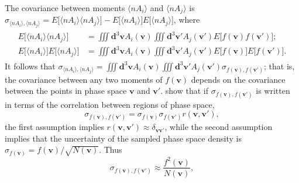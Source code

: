   The covariance between moments $\langle n A_i \rangle$ and $\langle
  n A_j \rangle$ is $\sigma_{\langle n A_i \rangle,\langle n A_j
    \rangle} = E \big [\langle n A_i \rangle\langle n A_j \rangle \big
  ] - E \big [\langle n A_i \rangle \big ] E \big [\langle n A_j
  \rangle \big ]$, where
    \begin{align}
      \begin{split}
        E \big [\langle n A_i \rangle\langle n A_j \rangle
        \big ] &= \iiint \mathbf{d}^3 \mathbf{v} A_i (\mathbf{v}) \iiint \mathbf{d}^3 \mathbf{v'} A_j (\mathbf{v'}) E \big [f(\mathbf{v}) f(\mathbf{v'}) \big ];
        \\
        E \big [\langle n A_i \rangle \big ] E \big [\langle n A_j
        \rangle \big ] &= \iiint \mathbf{d}^3 \mathbf{v} A_i (\mathbf{v}) \iiint \mathbf{d}^3 \mathbf{v'} A_j (\mathbf{v'}) E \big [f(\mathbf{v}) \big ] E \big [ f(\mathbf{v'}) \big ].
      \end{split}
    \end{align}
  It follows that $ \sigma_{\langle n A_i \rangle,\langle n A_j
    \rangle } = \iiint \mathbf{d}^3 \mathbf{v} A_i (\mathbf{v}) \iiint
  \mathbf{d}^3 \mathbf{v'} A_j (\mathbf{v'})
  \sigma_{f(\mathbf{v}),f(\mathbf{v'})}$; that is, the covariance
  between any two moments of $f(\mathbf{v})$ depends on the covariance
  between the points in phase space $\mathbf{v}$ and
  $\mathbf{v'}$. \citet{Gershman2015} show that if
  $\sigma_{f(\mathbf{v}),f(\mathbf{v'})}$ is written in terms of the
  correlation between regions of phase space,
    \begin{equation}
      \sigma_{f(\mathbf{v}),f(\mathbf{v'})} = \sigma_{f(\mathbf{v})} \sigma_{f(\mathbf{v'})}r(\mathbf{v},\mathbf{v'}),
    \end{equation}
  the first assumption implies $r(\mathbf{v},\mathbf{v'}) \approx
  \delta_{\mathbf{v v'}}$, while the second assumption implies that
  the uncertainty of the sampled phase space density is
  $\sigma_{f(\mathbf{v})} = f (\mathbf{v}) \big / \sqrt{N
    (\mathbf{v})}$. Thus
    \begin{equation}
      \sigma_{f(\mathbf{v}),f(\mathbf{v'})} \approx
      \frac{f^2(\mathbf{v})}{N(\mathbf{v})}, 
    \end{equation}
